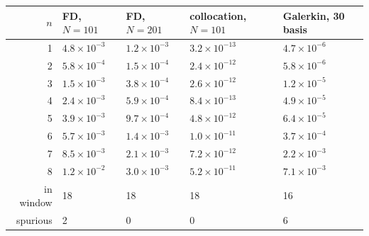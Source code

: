 \begin{tabular}{rllll}
\toprule
$n$ & FD, $N=101$ & FD, $N=201$ & collocation, $N=101$ & Galerkin, 30 basis\\
\midrule
1 & $4.8\times10^{-3}$ & $1.2\times10^{-3}$ & $3.2\times10^{-13}$ & $4.7\times10^{-6}$\\
2 & $5.8\times10^{-4}$ & $1.5\times10^{-4}$ & $2.4\times10^{-12}$ & $5.8\times10^{-6}$\\
3 & $1.5\times10^{-3}$ & $3.8\times10^{-4}$ & $2.6\times10^{-12}$ & $1.2\times10^{-5}$\\
4 & $2.4\times10^{-3}$ & $5.9\times10^{-4}$ & $8.4\times10^{-13}$ & $4.9\times10^{-5}$\\
5 & $3.9\times10^{-3}$ & $9.7\times10^{-4}$ & $4.8\times10^{-12}$ & $6.4\times10^{-5}$\\
6 & $5.7\times10^{-3}$ & $1.4\times10^{-3}$ & $1.0\times10^{-11}$ & $3.7\times10^{-4}$\\
7 & $8.5\times10^{-3}$ & $2.1\times10^{-3}$ & $7.2\times10^{-12}$ & $2.2\times10^{-3}$\\
8 & $1.2\times10^{-2}$ & $3.0\times10^{-3}$ & $5.2\times10^{-11}$ & $7.1\times10^{-3}$\\
\midrule
in window & 18 & 18 & 18 & 16\\
spurious & 2 & 0 & 0 & 6\\
\bottomrule
\end{tabular}
